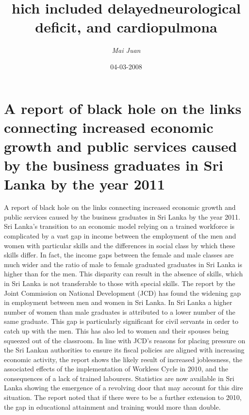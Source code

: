 \documentclass{article}%
\title{hich included delayedneurological deficit, and cardiopulmona}%
\author{\textit{Mai Juan}}%
\date{04-03-2008}%
\begin{document}
%
\normalsize%
\maketitle%
\section{A report of black hole on the links connecting increased economic growth and public services caused by the business graduates in Sri Lanka by the year 2011}%
\label{sec:AreportofblackholeonthelinksconnectingincreasedeconomicgrowthandpublicservicescausedbythebusinessgraduatesinSriLankabytheyear2011}%
A report of black hole on the links connecting increased economic growth and public services caused by the business graduates in Sri Lanka by the year 2011.\newline%
Sri Lanka’s transition to an economic model relying on a trained workforce is complicated by a vast gap in income between the employment of the men and women with particular skills and the differences in social class by which these skills differ.\newline%
In fact, the income gaps between the female and male classes are much wider and the ratio of male to female graduated graduates in Sri Lanka is higher than for the men. This disparity can result in the absence of skills, which in Sri Lanka is not transferable to those with special skills.\newline%
The report by the Joint Commission on National Development (JCD) has found the widening gap in employment between men and women in Sri Lanka. In Sri Lanka a higher number of women than male graduates is attributed to a lower number of the same graduate. This gap is particularly significant for civil servants in order to catch up with the men.\newline%
This has also led to women and their spouses being squeezed out of the classroom.\newline%
In line with JCD’s reasons for placing pressure on the Sri Lankan authorities to ensure its fiscal policies are aligned with increasing economic activity, the report shows the likely result of increased joblessness, the associated effects of the implementation of Workless Cycle in 2010, and the consequences of a lack of trained labourers.\newline%
Statistics are now available in Sri Lanka showing the emergence of a revolving door that may account for this dire situation. The report noted that if there were to be a further extension to 2010, the gap in educational attainment and training would more than double.\newline%
\end{document}
